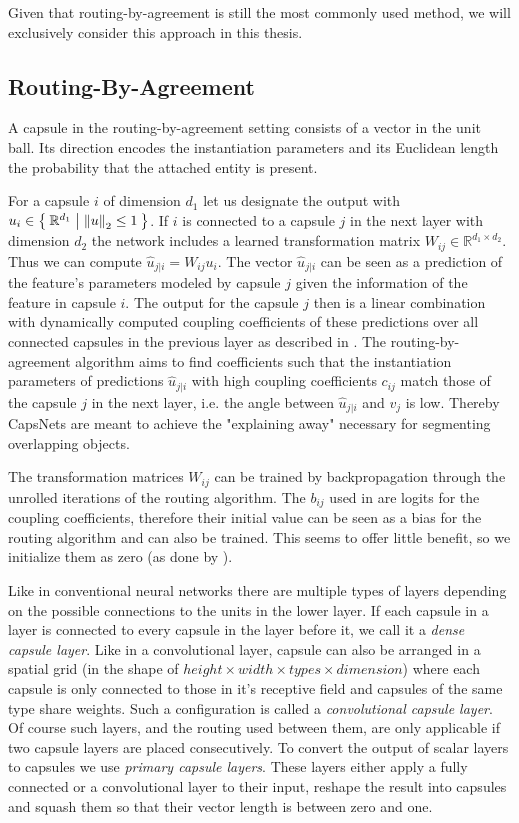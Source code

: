 Given that routing-by-agreement is still the most commonly used method, we will exclusively consider this approach in this thesis.

\subsection{Routing-By-Agreement}

\newcommand{\uhat}{\hat{u}_{j \vert i}}

A capsule in the routing-by-agreement setting consists of a vector in the unit ball.
Its direction encodes the instantiation parameters and its Euclidean length the probability that the attached entity is present.

For a capsule $i$ of dimension $d_1$ let us designate the output with $u_i \in \Set{ \mathbb{R}^{d_1} | \left \lVert u \right \rVert _{2} \leq 1}$.
If $i$ is connected to a capsule $j$ in the next layer with dimension $d_2$ the network includes a learned transformation matrix $W_{ij} \in \mathbb{R}^{d_1 \times d_2}$.
Thus we can compute $\uhat = W_{ij} u_i$.
The vector $\uhat$ can be seen as a prediction of the feature's parameters modeled by capsule $j$ given the information of the feature in capsule $i$.
The output for the capsule $j$ then is a linear combination with dynamically computed coupling coefficients of these predictions over all connected capsules in the previous layer as described in .
The routing-by-agreement algorithm aims to find coefficients such that the instantiation parameters of predictions $\uhat$ with high coupling coefficients $c_{ij}$ match those of the capsule $j$ in the next layer, i.e. the angle between $\uhat$ and $v_j$ is low.
Thereby CapsNets are meant to achieve the "explaining away" necessary for segmenting overlapping objects.

The transformation matrices $W_{ij}$ can be trained by backpropagation through the unrolled iterations of the routing algorithm.
The $b_{ij}$ used in  are logits for the coupling coefficients, therefore their initial value can be seen as a bias for the routing algorithm and can also be trained.
This seems to offer little benefit, so we initialize them as zero (as done by \cite{capsules}).

Like in conventional neural networks there are multiple types of layers depending on the possible connections to the units in the lower layer.
If each capsule in a layer is connected to every capsule in the layer before it, we call it a \emph{dense capsule layer}.
Like in a convolutional layer, capsule can also be arranged in a spatial grid (in the shape of $height \times width \times types \times dimension$) where each capsule is only connected to those in it's receptive field and capsules of the same type share weights.
Such a configuration is called a \emph{convolutional capsule layer}.
Of course such layers, and the routing used between them, are only applicable if two capsule layers are placed consecutively.
To convert the output of scalar layers to capsules we use \emph{primary capsule layers}.
These layers either apply a fully connected or a convolutional layer to their input, reshape the result into capsules and squash them so that their vector length is between zero and one.

